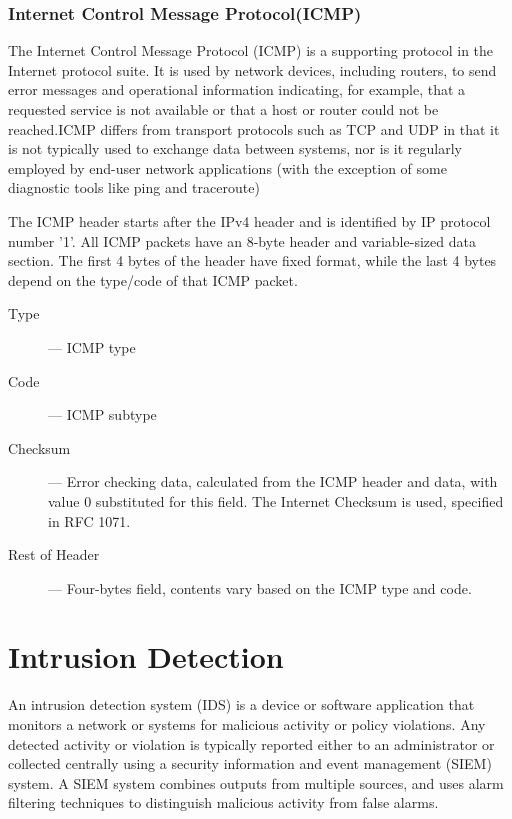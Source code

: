\documentclass[12pt]{article}
\theoremstyle{definition}
\begin{document}
			\subsubsection{Internet Control Message Protocol(ICMP)}
			The Internet Control Message Protocol (ICMP) is a supporting protocol in the Internet protocol suite. It is used by network devices, including routers, to send error messages and operational information indicating, for example, that a requested service is not available or that a host or router could not be reached.ICMP differs from transport protocols such as TCP and UDP in that it is not typically used to exchange data between systems, nor is it regularly employed by end-user network applications (with the exception of some diagnostic tools like ping and traceroute)
			
			The ICMP header starts after the IPv4 header and is identified by IP protocol number '1'. All ICMP packets have an 8-byte header and variable-sized data section. The first 4 bytes of the header have fixed format, while the last 4 bytes depend on the type/code of that ICMP packet.
			
			
			\begin{description}
				\item [Type ] --- ICMP type
				\item [Code ] --- ICMP subtype
				\item [Checksum] --- Error checking data, calculated from the ICMP header and data, with value 0 substituted for this field. The Internet Checksum is used, specified in RFC 1071.
				\item [Rest of Header] --- Four-bytes field, contents vary based on the ICMP type and code.
			\end{description}
			
	
	\cleardoublepage
	\section{Intrusion Detection}\label{sec:i-detection}
		An intrusion detection system (IDS) is a device or software application that monitors a network or systems for malicious activity or policy violations. Any detected activity or violation is typically reported either to an administrator or collected centrally using a security information and event management (SIEM) system. A SIEM system combines outputs from multiple sources, and uses alarm filtering techniques to distinguish malicious activity from false alarms.
		
\end{document}
